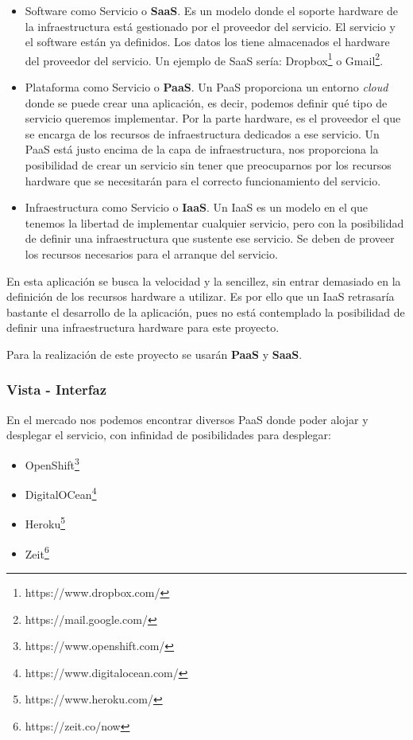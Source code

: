 \begin{itemize}
    \item Software como Servicio o \textbf{SaaS}. Es un modelo donde el soporte hardware de la infraestructura está gestionado por el proveedor del servicio. El servicio y el software están ya definidos. Los datos los tiene almacenados el  hardware del proveedor del servicio. Un ejemplo de SaaS sería: Dropbox\footnote{https://www.dropbox.com/} o Gmail\footnote{https://mail.google.com/}.
    \item Plataforma como Servicio o \textbf{PaaS}. Un PaaS proporciona un entorno \textit{cloud} donde se puede crear una aplicación, es decir, podemos definir qué tipo de servicio queremos implementar. Por la parte hardware, es el proveedor el que se encarga de los recursos de infraestructura dedicados a ese servicio. Un PaaS está justo encima de la capa de infraestructura, nos proporciona la posibilidad de crear un servicio sin tener que preocuparnos por los recursos hardware que se necesitarán para el correcto funcionamiento del servicio.
    \item Infraestructura como Servicio o \textbf{IaaS}. Un IaaS es un modelo en el que tenemos la libertad de implementar cualquier servicio, pero con la posibilidad de definir una infraestructura que sustente ese servicio. Se deben de proveer los recursos necesarios para el arranque del servicio.
\end{itemize}

En esta aplicación se busca la velocidad y la sencillez, sin entrar demasiado en la definición de los recursos hardware a utilizar. Es por ello que un IaaS retrasaría bastante el desarrollo de la aplicación, pues no está contemplado la posibilidad de definir una infraestructura hardware para este proyecto.

Para la realización de este proyecto se usarán \textbf{PaaS} y \textbf{SaaS}.

\subsubsection{Vista - Interfaz}

En el mercado nos podemos encontrar diversos PaaS donde poder alojar y desplegar el servicio, con infinidad de posibilidades para desplegar:

\begin{itemize}
    \item OpenShift\footnote{https://www.openshift.com/} 
    \item DigitalOCean\footnote{https://www.digitalocean.com/}
    \item Heroku\footnote{https://www.heroku.com/}
    \item Zeit\footnote{https://zeit.co/now}
\end{itemize}


